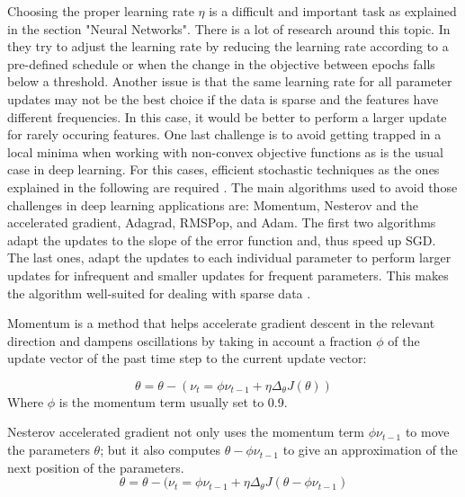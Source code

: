 Choosing the proper learning rate $\eta$ is a difficult and important task as explained in the section "Neural Networks". There is a lot of research around this topic. In \cite{robbins1951stochastic} they try to adjust the learning rate by reducing the learning rate according to a pre-defined schedule or when the change in the objective between epochs falls below a threshold. Another issue is that the same learning rate for all parameter updates may not be the best choice if the data is sparse and the features have different frequencies. In this case, it would be better to perform a larger update for rarely occuring features. One last challenge is to avoid getting trapped in a local minima when working with non-convex objective functions as is the usual case in deep learning. For this cases, efficient stochastic techniques as the ones explained in the following are required \cite{ruder2016overview}.
The main algorithms used to avoid those challenges in deep learning applications are: Momentum, Nesterov and the accelerated gradient, Adagrad, RMSPop, and Adam. The first two algorithms adapt the updates to the slope of the error function and, thus speed up SGD. The last ones, adapt the updates to each individual parameter to perform larger updates for infrequent and smaller updates for frequent parameters. This makes the algorithm well-suited for dealing with sparse data \cite{ruder2016overview}.

Momentum \cite{qian1999momentum} is a method that helps accelerate gradient descent in the relevant direction and dampens oscillations by taking in account a fraction $\phi$ of the update vector of the past time step to the current update vector:

\begin{equation}
\theta=\theta-(\nu_t=\phi \nu_{t-1} + \eta \Delta_\theta J(\theta))
\end{equation}
Where $\phi$ is the momentum term usually set to 0.9.


Nesterov accelerated gradient \cite{nesterov1983method} not only uses the momentum term $\phi \nu_{t-1}$  to move the parameters $\theta$; but it also computes $\theta - \phi \nu_{t-1}$ to give an approximation of the next position of the parameters.  
\begin{equation}
\theta=\theta-(\nu_t = \phi \nu_{t-1} + \eta \Delta_\theta J(\theta - \phi \nu_{t-1})
\end{equation}
 

